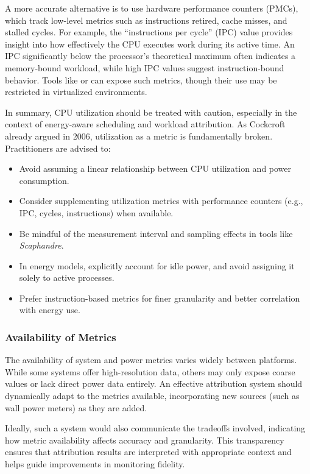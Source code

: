 A more accurate alternative is to use hardware performance counters (PMCs), which track low-level metrics such as instructions retired, cache misses, and stalled cycles. For example, the ``instructions per cycle'' (IPC) value provides insight into how effectively the CPU executes work during its active time. An IPC significantly below the processor's theoretical maximum often indicates a memory-bound workload, while high IPC values suggest instruction-bound behavior. Tools like  or  can expose such metrics, though their use may be restricted in virtualized environments.

In summary, CPU utilization should be treated with caution, especially in the context of energy-aware scheduling and workload attribution. As Cockcroft already argued in 2006, utilization as a metric is fundamentally broken\parencite{cockcroft2006utilization}. Practitioners are advised to:
\begin{itemize}
    \item Avoid assuming a linear relationship between CPU utilization and power consumption.
    \item Consider supplementing utilization metrics with performance counters (e.g., IPC, cycles, instructions) when available.
    \item Be mindful of the measurement interval and sampling effects in tools like \textit{Scaphandre}.
    \item In energy models, explicitly account for idle power, and avoid assigning it solely to active processes.
    \item Prefer instruction-based metrics for finer granularity and better correlation with energy use.
\end{itemize}

\subsubsection{Availability of Metrics}

The availability of system and power metrics varies widely between platforms. While some systems offer high-resolution data, others may only expose coarse values or lack direct power data entirely. An effective attribution system should dynamically adapt to the metrics available, incorporating new sources (such as wall power meters) as they are added.

Ideally, such a system would also communicate the tradeoffs involved, indicating how metric availability affects accuracy and granularity. This transparency ensures that attribution results are interpreted with appropriate context and helps guide improvements in monitoring fidelity.

